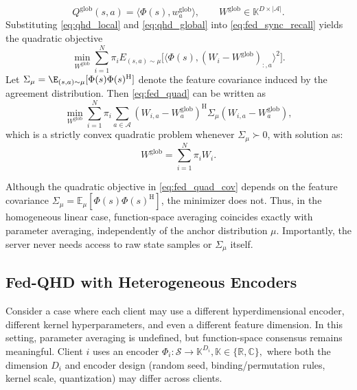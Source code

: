 \begin{equation}
Q^{\mathrm{glob}}(s,a) = \langle \Phi(s), w^{\mathrm{glob}}_a \rangle,
\qquad
W^{\mathrm{glob}} \in \mathbb{K}^{D \times |\mathcal{A}|}.
\label{eq:qhd_global}
\end{equation}
Substituting \eqref{eq:qhd_local} and \eqref{eq:qhd_global} into \eqref{eq:fed_sync_recall} yields the quadratic objective
\begin{equation}
\min_{W^{\mathrm{glob}}}\sum_{i=1}^N \pi_i E_{(s,a)\sim\mu} \big[ \langle \Phi(s), (W_i - W^{\mathrm{glob}})_{:,a} \rangle^2\big].
\label{eq:fed_quad}
\end{equation}
Let $\Sigma_\mu = \E_{(s,a)\sim\mu}[\Phi(s)\Phi(s)^\mathrm{H}]$ denote the
feature covariance induced by the agreement distribution.
Then \eqref{eq:fed_quad} can be written as
\begin{equation}
\min_{W^{\mathrm{glob}}} \sum_{i=1}^N \pi_i \sum_{a\in\mathcal{A}} (W_{i,a}-W^{\mathrm{glob}}_a)^\mathrm{H} \Sigma_\mu (W_{i,a}-W^{\mathrm{glob}}_a),
\label{eq:fed_quad_cov}
\end{equation}
which is a strictly convex quadratic problem whenever $\Sigma_\mu \succ 0$, with solution as:
\begin{equation}
W^{\mathrm{glob}} = \sum_{i=1}^N \pi_i W_i.
\label{eq:exact_avg}
\end{equation}

Although the quadratic objective in
\eqref{eq:fed_quad_cov} depends on the feature covariance
$\Sigma_\mu = \mathbb E_\mu[\Phi(s)\Phi(s)^{\mathrm H}]$,
the minimizer does not.
Thus, in the homogeneous linear case,
function-space averaging coincides exactly with
parameter averaging,
independently of the anchor distribution $\mu$.
Importantly, the server never needs access to
raw state samples or $\Sigma_\mu$ itself.


\subsection{Fed-QHD with Heterogeneous Encoders}
\label{sec:fedqhd_heterogeneous}
Consider a case where each client may use a different hyperdimensional encoder, different kernel hyperparameters, and even a different feature dimension.  In this setting, parameter averaging is undefined, but function-space consensus remains meaningful. Client $i$ uses an encoder \(\Phi_i:\mathcal{S}\to\mathbb{K}^{D_i}, \mathbb{K}\in\{\mathbb{R},\mathbb{C}\},\)
where both the dimension $D_i$ and encoder design (random seed, binding/permutation rules, kernel scale, quantization)
may differ across clients. 

